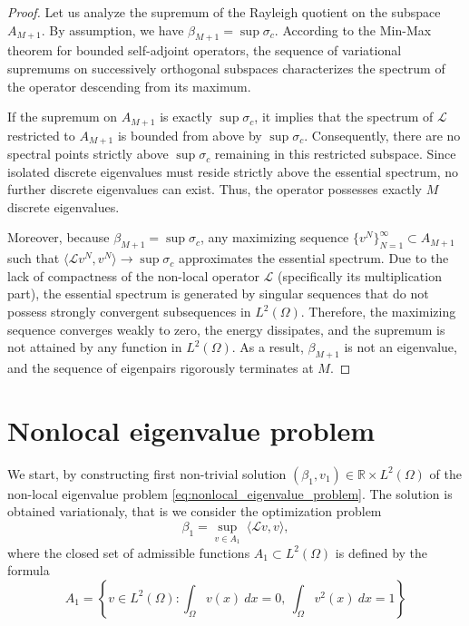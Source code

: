 \documentclass[11pt, a4paper]{article}
\theoremstyle{break}
\theoremstyle{break}
\theoremstyle{break}
\theoremstyle{break}
\theoremstyle{break}
\theoremstyle{break}
\theoremstyle{break}
\theoremstyle{break}
\theoremstyle{break}
\begin{document}
\begin{proof}
    Let us analyze the supremum of the Rayleigh quotient on the subspace $A_{M+1}$. By assumption, we have $\beta_{M+1} = \sup \sigma_c$. 
    According to the Min-Max theorem for bounded self-adjoint operators, the sequence of variational supremums on successively orthogonal subspaces characterizes the spectrum of the operator descending from its maximum. 
    
    If the supremum on $A_{M+1}$ is exactly $\sup \sigma_c$, it implies that the spectrum of $\mathcal{L}$ restricted to $A_{M+1}$ is bounded from above by $\sup \sigma_c$. Consequently, there are no spectral points strictly above $\sup \sigma_c$ remaining in this restricted subspace. Since isolated discrete eigenvalues must reside strictly above the essential spectrum, no further discrete eigenvalues can exist. Thus, the operator possesses exactly $M$ discrete eigenvalues.
    
    Moreover, because $\beta_{M+1} = \sup \sigma_c$, any maximizing sequence $\{v^N\}_{N=1}^\infty \subset A_{M+1}$ such that $\langle \mathcal{L}v^N, v^N \rangle \to \sup \sigma_c$ approximates the essential spectrum. Due to the lack of compactness of the non-local operator $\mathcal{L}$ (specifically its multiplication part), the essential spectrum is generated by singular sequences that do not possess strongly convergent subsequences in $L^2(\Omega)$. Therefore, the maximizing sequence converges weakly to zero, the energy dissipates, and the supremum is not attained by any function in $L^2(\Omega)$. As a result, $\beta_{M+1}$ is not an eigenvalue, and the sequence of eigenpairs rigorously terminates at $M$.
\end{proof}

\section{Nonlocal eigenvalue problem}

We start, by constructing first non-trivial solution $(\beta_1, v_1) \in \mathbb{R} \times L^2(\Omega)$ of the non-local eigenvalue problem \eqref{eq:nonlocal_eigenvalue_problem}. The solution is obtained variationaly, that is we consider the optimization problem
\begin{equation}
    \label{eq:eigenvalue_problem_1}
    \beta_1 = \sup_{v \in A_1} \: \langle \mathcal L v, v \rangle,
\end{equation}
where the closed set of admissible functions $A_1 \subset L^2(\Omega)$ is defined by the formula
\begin{equation}
    \label{eq:A_set_Def}
    A_1 = \left\{ v \in L^2(\Omega) : \int_\Omega v(x) \:dx = 0, \: \int_\Omega v^2(x) \:dx = 1 \right\}
\end{equation}
\end{document}
